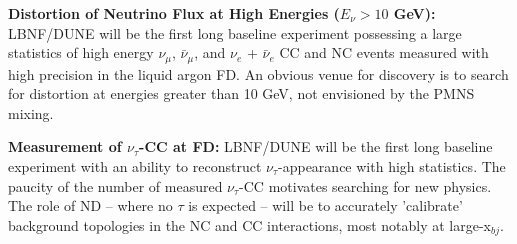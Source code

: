 \vspace{0.25cm} 
\noindent 
{\bf Distortion of Neutrino Flux at High Energies ($E_\nu > 10$ GeV):} 
LBNF/DUNE will be the first long baseline experiment possessing a large 
statistics of high energy $\nu_\mu$,  $\bar \nu_\mu$, and $\nu_e$ + $\bar \nu_e$ CC and NC events 
measured with high precision in the liquid argon FD. An obvious venue for discovery is to 
search for distortion at energies greater than 10 GeV, not envisioned by the 
PMNS mixing. 


\vspace{0.25cm} 
\noindent 
{\bf Measurement of $\nu_\tau$-CC at FD:} 
LBNF/DUNE will be the first long baseline experiment with an ability to 
reconstruct $\nu_\tau$-appearance with high statistics. The paucity of the number of measured 
$\nu_\tau$-CC motivates searching for new physics. 
The role of ND -- where no $\tau$ is expected -- will be to accurately 'calibrate' background topologies 
in the NC and CC interactions, most notably at large-x$_{bj}$. 



